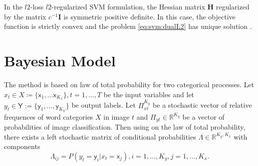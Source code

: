 \documentclass{aip-cp}
\begin{document}
In the $l2$-loss $l2$-regularized SVM formulation, the Hessian matrix $\boldsymbol{H}$ regularized by the matrix $c^{-1}\boldsymbol{I}$ is symmetric positive definite. In this case, the objective function is strictly convex and the problem \eqref{eq:svm:dualL2} has unique solution \cite{DosBOOK-2009}.

\section{Bayesian Model}

The method is based on law of total probability for two categorical processes. 
Let $x_t \in X \coloneqq \lbrace \mathsf{x}_1, \dots \mathsf{x}_{K_x} \rbrace, t = 1,\dots,T$ be the input variables and let $y_t \in \mathsf{Y} := \lbrace \mathsf{y}_1, \dots, \mathsf{y}_{K_Y} \rbrace$ be output labels.
Let $\Pi_{xt}^{K_y}$ be a stochastic vector of relative frequences of word categories $X$ in image $t$ and $\Pi_{yt} \in \mathbb{R}^{K_y}$ be a vector of probabilities of image classification. Then using on the law of total probability, there exists a left stochastic matrix of conditional probabilities $\Lambda \in \mathbb{R}^{K_y,K_x}$ with components
\begin{equation}
    \Lambda_{ij} = P(y_t = \mathsf{y}_i | x_t = \mathsf{x}_j), i = 1, \dots, K_y, j = 1, \dots, K_x.
\end{equation}

\end{document}
